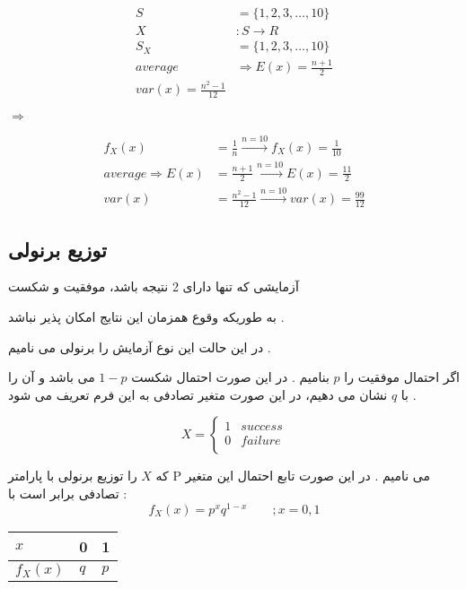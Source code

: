 \documentclass[12pt]{book}
\begin{document}
\begin{align*}
S &= \{ 1, 2, 3, \dots , 10 \} \\
X &: S \to R \\
S_{X} &= \{ 1, 2, 3, \dots , 10 \} \\
average &\Rightarrow E(x) = \frac{n+1}{2}  \\
var(x) = \frac{n^{2}-1}{12} 
\end{align*}

$
\Rightarrow
$

\begin{align*}
f_{X}(x) &= \frac{1}{n} \xrightarrow{n=10} f_{X}(x) = \frac{1}{10} \\
average \Rightarrow E(x) &= \frac{n+1}{2} \xrightarrow{n=10} E(x) = \frac{11}{2}  \\
var(x) &= \frac{n^{2}-1}{12}  \xrightarrow{n=10} var(x) = \frac{99}{12}
\end{align*}



\subsection{توزیع برنولی}
آزمایشی که تنها دارای 2 نتیجه باشد، موفقیت و شکست

به طوریکه وقوع همزمان این نتایج امکان پذیر نباشد .

در این حالت این نوع آزمایش را برنولی می نامیم .

اگر احتمال موفقیت را $p$ بنامیم . در این صورت احتمال شکست
$1-p$
می باشد و آن را با $q$ نشان می دهیم، در این صورت متغیر تصادفی به این فرم تعریف می شود .

$$
X = 
\begin{cases}
1 & success \\
0 & failure\\
\end{cases}
$$

که $X$ را توزیع برنولی با پارامتر P می نامیم .
در این صورت تابع احتمال این متغیر تصادفی برابر است با :
$$
f_{X}(x) = p^{x} q ^{1-x} \qquad ; x = 0 , 1 
$$



\begin{center}
\begin{latin}
\begin{tabular}{ l |  l  l }
  $x$ & 0 & 1 \\
  \hline
  $f_{X}(x)$ & $q$ & $p$ \\
\end{tabular}
\end{latin}
\end{center}
\end{document}

